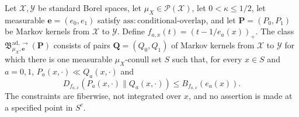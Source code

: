 Let \(\mathcal X,\mathcal Y\) be standard Borel spaces, let \(\mu_X\in\mathcal P(\mathcal X)\), let \(0<\kappa\le1/2\), let measurable \(\boldsymbol e=(e_0,e_1)\) satisfy \(\mathrm{ass:conditional\text{-}overlap}\), and let \(\boldsymbol P=(P_0,P_1)\) be Markov kernels from \(\mathcal X\) to \(\mathcal Y\).  Define \(f_{a,x}(t)=(t-1/e_a(x))_+\).  The class \(\mathfrak B^{\mathrm{ad},\to}_{\mu_X,\boldsymbol e}(\boldsymbol P)\) consists of pairs \(\boldsymbol Q=(Q_0,Q_1)\) of Markov kernels from \(\mathcal X\) to \(\mathcal Y\) for which there is one measurable \(\mu_X\)-conull set \(S\) such that, for every \(x\in S\) and \(a=0,1\), \(P_a(x,\cdot)\ll Q_a(x,\cdot)\) and
\[
 D_{f_{a,x}}(P_a(x,\cdot)\|Q_a(x,\cdot))\le B_{f_{a,x}}(e_a(x)).
\]
The constraints are fiberwise, not integrated over \(x\), and no assertion is made at a specified point in \(S^c\).